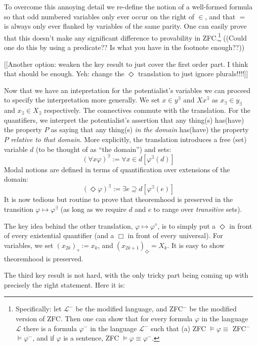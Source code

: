\documentclass{article}
\begin{document}
To overcome this annoying detail  we re-define the notion 
of a well-formed formula so that odd numbered variables only ever occur on the right of $\in$, 
and that $=$ is always only ever flanked by variables of the same parity. One can easily prove that this doesn't make any significant difference to 
provability in ZFC.\footnote{Specifically: let $\mathcal{L}^-$ be the modified language, 
and ZFC$^-$ be the modified version of ZFC. Then one can show that for every formula $\varphi$ 
in the language $\mathcal{L}$ there is a formula $\varphi^-$ in the language $\mathcal{L}^-$ such that 
(a) ZFC $\vDash \varphi \equiv$ ZFC$^-$ $\vDash \varphi^-$, and if $\varphi$ is a sentence, 
ZFC $\vDash \varphi \equiv \varphi^-$.} ((Could one do this by using a predicate??
Is what you have in the footnote enough??))


[[Another option: weaken the key result to just cover the first order part. I think 
that should be enough. Yeh: change the $\Diamond$ translation to just ignore plurals!!!!]]

Now that we have an intepretation for the potentialist's variables we can proceed to specify 
the interpretation more generally. We set $x \in y^\exists$ and $Xx^\exists$ as $x_\exists \in y_\exists$ 
and $x_\exists \in X_\exists$ respectively. The connectives commute with the translation. For the quantifiers,
we interpret the potentialist's assertion that any thing(s) has(have) the property $P$ as saying 
that any thing(s) \emph{in the domain} has(have) the property $P$ \emph{relative to that domain}. More explicitly, 
the translation introduces a free (set) variable $d$ (to be thought of as ``the domain'') and sets:
\[(\forall x \varphi)^\exists := \forall x \in d [\varphi^\exists(d)]\]
Modal notions are defined in terms of quantification over extensions of the domain:
\[ (\Diamond \varphi)^\exists := \exists e \supseteq d [\varphi^\exists(e)]\]
It is now tedious but routine to prove that theoremhood is preserved 
in the transition $\varphi \mapsto \varphi^\exists$ (as long as we require $d$ and $e$ 
to range over \emph{transitive} sets).

The key idea behind the other translation, $\varphi \mapsto \varphi^\diamond$, 
is to simply put a $\Diamond$ in front of every existential quantifier (and a $\Box$ in front of 
every universal). For variables, we set $(x_{2k})_\diamond := x_k$, and $(x_{2k+1})_\Diamond = X_k$.
It is easy to show theoremhood is preserved.

The third key result is not hard, with the only tricky part being coming up with precisely 
the right statement. Here it is:
\end{document}
